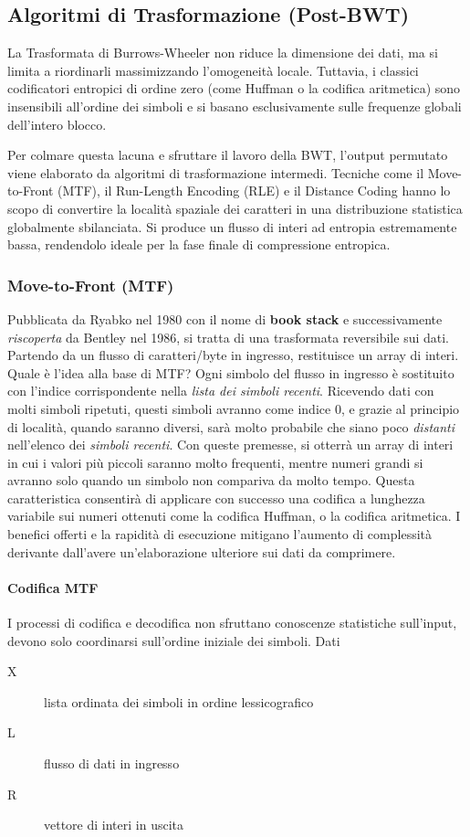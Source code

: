 \subsection{Algoritmi di Trasformazione (Post-BWT)}
La Trasformata di Burrows-Wheeler non riduce la dimensione dei dati, ma si limita a riordinarli massimizzando l'omogeneità locale. Tuttavia, i classici codificatori entropici di ordine zero (come Huffman o la codifica aritmetica) sono insensibili all'ordine dei simboli e si basano esclusivamente sulle frequenze globali dell'intero blocco.

Per colmare questa lacuna e sfruttare il lavoro della BWT, l'output permutato viene elaborato da algoritmi di trasformazione intermedi. Tecniche come il Move-to-Front (MTF), il Run-Length Encoding (RLE) e il Distance Coding hanno lo scopo di convertire la località spaziale dei caratteri in una distribuzione statistica globalmente sbilanciata. Si produce un flusso di interi ad entropia estremamente bassa, rendendolo ideale per la fase finale di compressione entropica.

\subsubsection{Move-to-Front (MTF)}
Pubblicata da Ryabko nel 1980 con il nome di \textbf{book stack} e successivamente \textit{riscoperta} da Bentley nel 1986, si tratta di una trasformata reversibile sui dati. Partendo da un flusso di caratteri/byte in ingresso, restituisce un array di interi. Quale è l'idea alla base di MTF?
Ogni simbolo del flusso in ingresso è sostituito con l'indice corrispondente nella \textit{lista dei simboli recenti}. Ricevendo dati con molti simboli ripetuti, questi simboli avranno come indice $0$, e grazie al principio di località, quando saranno diversi, sarà molto probabile che siano poco \textit{distanti} nell'elenco dei \textit{simboli recenti}. Con queste premesse, si otterrà un array di interi in cui i valori più piccoli saranno molto frequenti, mentre numeri grandi si avranno solo quando un simbolo non compariva da molto tempo. Questa caratteristica consentirà di applicare con successo una codifica a lunghezza variabile sui numeri ottenuti come la codifica Huffman, o la codifica aritmetica.
I benefici offerti e la rapidità di esecuzione mitigano l'aumento di complessità derivante dall'avere un'elaborazione ulteriore sui dati da comprimere. 

\paragraph{Codifica MTF}
I processi di codifica e decodifica non sfruttano conoscenze statistiche sull'input, devono solo coordinarsi sull'ordine iniziale dei simboli.
Dati
\begin{description}
    \item[X] lista ordinata dei simboli in ordine lessicografico
    \item[L] flusso di dati in ingresso
    \item[R] vettore di interi in uscita
\end{description}

